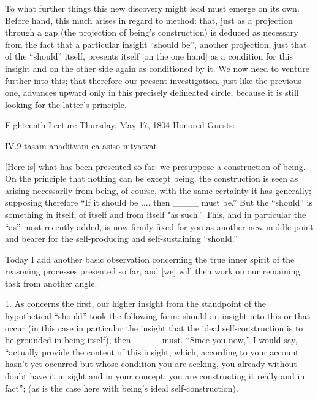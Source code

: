 To what further things this new discovery
might lead  must emerge on its own.
Before hand, this much arises in regard to method:
that, just as a projection through a gap
(the projection of being's construction)
is deduced as necessary from the fact
that a particular insight “should be”,
another projection, just that of the “should” itself,
presents itself [on the one hand] as
a condition for this insight
and on the other side again as conditioned by it.
We now need to venture further into this;
that therefore our present investigation,
just like the previous one,
advances upward only in this
precisely delineated circle,
because it is still looking
for the latter's principle.

Eighteenth Lecture
Thursday, May 17, 1804
Honored Guests:

IV.9
tasam anaditvam ca-asiso nityatvat

[Here is] what has been presented so far:
we presuppose a construction of being.
On the principle that nothing can be except being,
the construction is seen as arising necessarily from being,
of course, with the same certainty it has generally;
supposing therefore “If it should be ..., then ____ must be.”
But the “should” is something in itself, of itself and from itself "as such.”
This, and in particular the “as” most recently added,
is now firmly fixed for you as another new middle point
and bearer for the self-producing and self-sustaining “should.”

Today I add another basic observation
concerning the true inner spirit of
the reasoning processes presented so far,
and [we] will then work on
our remaining task from another angle.

1. As concerns the first,
our higher insight from the standpoint of
the hypothetical “should” took the following form:
should an insight into this or that occur
(in this case in particular the insight that
the ideal self-construction is to be grounded in being itself),
then ____ must.
“Since you now,” I would say,
“actually provide the content of this insight,
which, according to your account hasn't yet occurred
but whose condition you are seeking,
you already without doubt have it
in sight and in your concept;
you are constructing it really and in fact”;
(as is the case here with being's ideal self-construction).


